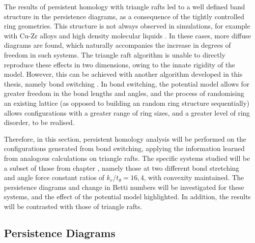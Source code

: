 The results of persistent homology with triangle rafts led to a well defined band structure in the persistence diagrams, as a consequence of the tightly controlled ring geometries.
This structure is not always observed in simulations, for example with Cu\--Zr alloys and high density molecular liquids \cite{Hiraoka2016,Onodera2019}.
In these cases, more diffuse diagrams are found, which naturally accompanies the increase in degrees of freedom in such systems.
The triangle raft algorithm is unable to directly reproduce these effects in two dimensions, owing to the innate rigidity of the model.
However, this can be achieved with another algorithm developed in this thesis, namely bond switching .
In bond switching, the potential model allows for greater freedom in the bond lengths and angles, and the process of randomising an existing lattice (as opposed to building an random ring structure sequentially) allows configurations with a greater range of ring sizes, and a greater level of ring disorder, to be realised.

Therefore, in this section, persistent homology analysis will be performed on the configurations generated from bond switching, applying the information learned from analogous calculations on triangle rafts.
The specific systems studied will be a subset of those from chapter , namely those at two different bond stretching and angle force constant ratios of $k_r/t_\theta=16,4$, with convexity maintained.
The persistence diagrams and change in Betti numbers will be investigated for these systems, and the effect of the potential model highlighted.
In addition, the results will be contrasted with those of triangle rafts.

\subsection{Persistence Diagrams}

